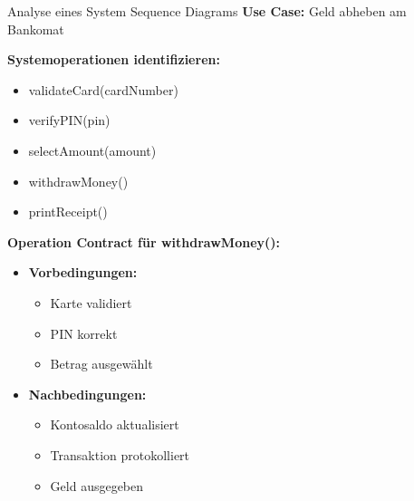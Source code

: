 \begin{example2}{Analyse eines System Sequence Diagrams}
\textbf{Use Case:} Geld abheben am Bankomat

\textbf{Systemoperationen identifizieren:}
\begin{itemize}
    \item validateCard(cardNumber)
    \item verifyPIN(pin)
    \item selectAmount(amount)
    \item withdrawMoney()
    \item printReceipt()
\end{itemize}

\textbf{Operation Contract für withdrawMoney():}
\begin{itemize}
    \item \textbf{Vorbedingungen:}
    \begin{itemize}
        \item Karte validiert
        \item PIN korrekt
        \item Betrag ausgewählt
    \end{itemize}
    \item \textbf{Nachbedingungen:}
    \begin{itemize}
        \item Kontosaldo aktualisiert
        \item Transaktion protokolliert
        \item Geld ausgegeben
    \end{itemize}
\end{itemize}
\end{example2}

